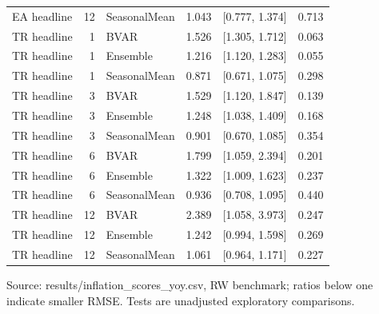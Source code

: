 \begin{table}[htbp]
\begin{tabularx}{\linewidth}{XrlrXr}
EA headline & 12 & SeasonalMean & 1.043 & [0.777, 1.374] & 0.713 \\
TR headline & 1 & BVAR & 1.526 & [1.305, 1.712] & 0.063 \\
TR headline & 1 & Ensemble & 1.216 & [1.120, 1.283] & 0.055 \\
TR headline & 1 & SeasonalMean & 0.871 & [0.671, 1.075] & 0.298 \\
TR headline & 3 & BVAR & 1.529 & [1.120, 1.847] & 0.139 \\
TR headline & 3 & Ensemble & 1.248 & [1.038, 1.409] & 0.168 \\
TR headline & 3 & SeasonalMean & 0.901 & [0.670, 1.085] & 0.354 \\
TR headline & 6 & BVAR & 1.799 & [1.059, 2.394] & 0.201 \\
TR headline & 6 & Ensemble & 1.322 & [1.009, 1.623] & 0.237 \\
TR headline & 6 & SeasonalMean & 0.936 & [0.708, 1.095] & 0.440 \\
TR headline & 12 & BVAR & 2.389 & [1.058, 3.973] & 0.247 \\
TR headline & 12 & Ensemble & 1.242 & [0.994, 1.598] & 0.269 \\
TR headline & 12 & SeasonalMean & 1.061 & [0.964, 1.171] & 0.227 \\
\bottomrule
\end{tabularx}
\par\vspace{3pt}\begin{minipage}{\linewidth}\footnotesize Source: results/inflation\_\allowbreak{}scores\_\allowbreak{}yoy.\allowbreak{}csv, RW benchmark; ratios below one indicate smaller RMSE.\allowbreak{} Tests are unadjusted exploratory comparisons.\allowbreak{}\end{minipage}
\end{table}
